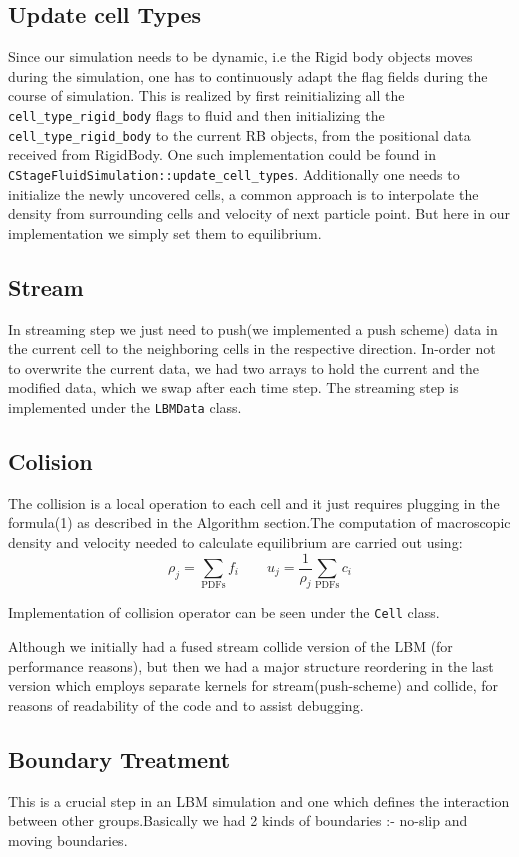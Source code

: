 \subsection *{Update cell Types}
Since our simulation needs to be dynamic, i.e the Rigid body objects moves during
the simulation, one has to continuously adapt the flag fields during the course of simulation. This is realized by first reinitializing all the \texttt {cell_type_rigid_body} flags to fluid and then initializing the \texttt{cell_type_rigid_body} to the current RB objects, from the positional data
received from RigidBody. One such implementation could be found in \texttt{CStageFluidSimulation::update_cell_types}. Additionally one needs to initialize the newly uncovered cells, a common approach is to interpolate the density from surrounding cells and velocity of next particle point. But here in our implementation we simply set them to equilibrium.
\subsection *{Stream}
 In streaming step we just need to push(we implemented a push scheme) data in the current cell to the neighboring cells in the respective direction. In-order not
 to overwrite the current data, we had two arrays to hold the current and the 
 modified data, which we swap after each time step. The streaming step is implemented under the \texttt{LBMData} class. 
 
 \subsection *{Colision}
 The collision is a local operation to each cell and it just requires plugging in the formula(1) as described in the Algorithm section.The computation of macroscopic density and velocity needed to calculate equilibrium are carried out using:
 \[\rho_j = \sum_{\mathrm{PDFs}} f_i\qquad u_j = \frac{1}{\rho_j} \sum_\mathrm{PDFs}
 c_i\]
 
  Implementation of collision operator can be seen under the \texttt{Cell} class.
 
 
 Although we initially had a fused stream collide version of the LBM (for performance reasons), but then we had a major structure reordering in the last version which employs separate kernels for   stream(push-scheme) and collide, for reasons of readability of the code and to assist debugging.
 
\subsection *{Boundary Treatment}
This is a crucial step in an LBM simulation and one which defines the interaction
between other groups.Basically we had 2 kinds of boundaries :- no-slip and moving boundaries. 
